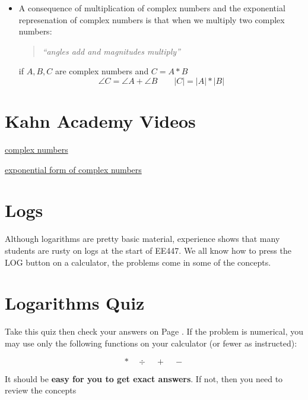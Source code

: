 \begin{itemize}
  \item A consequence of multiplication of complex numbers and the exponential represenation of complex numbers is that when we multiply two complex numbers:
     \begin{quotation} {\it ``angles add and magnitudes multiply''}
     \end{quotation}
   if $A,B,C$ are complex numbers and $C = A * B$
   \[
    \angle{C} = \angle{A}+\angle{B}  \qquad   |C| = |A|*|B|
   \]


\end{itemize}

\section{Kahn Academy Videos}\label{KahnV}

\href{https://www.khanacademy.org/math/algebra/complex-numbers/complex_numbers/v/complex-numbers}{complex numbers}

\href{https://www.khanacademy.org/math/trigonometry/imaginary_complex_precalc/complex_analysis/v/exponential-form-to-find-complex-roots}{exponential form of complex numbers}








\section{Logs}\label{LogReview}

Although logarithms are pretty basic material, experience shows that many students are rusty on logs at the start of EE447.
We all know how to press the LOG button on a calculator, the problems come in some of the concepts.


\section{Logarithms Quiz}

Take this quiz then check your answers on Page \pageref{Log_answers}.  If the problem is numerical, you may use only the following functions on your calculator (or fewer as instructed):

\[
* \quad \div \quad + \quad -
\]


It should be {\bf easy for you to get exact answers}.  If not, then you need to review the concepts


